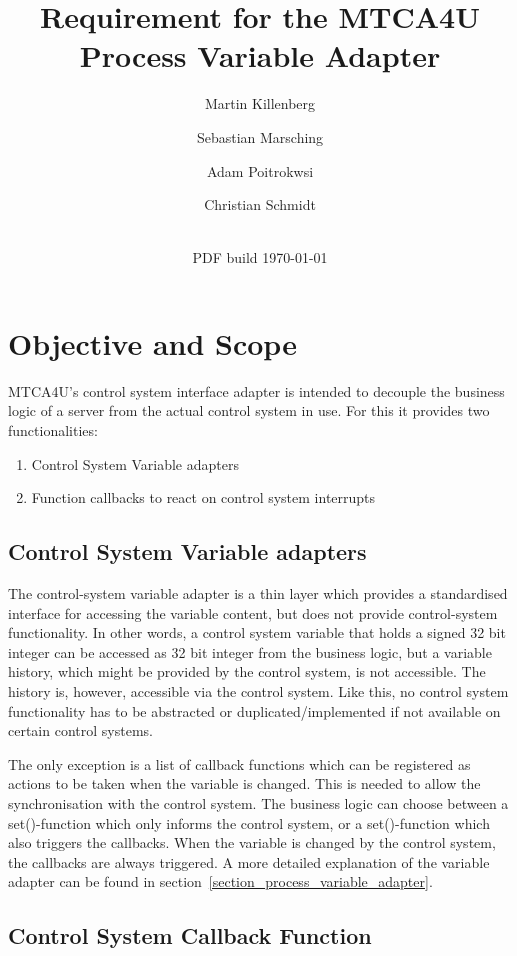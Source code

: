 \documentclass[11pt,a4paper]{scrartcl}
\title{Requirement for the MTCA4U Process Variable Adapter}
\date{\svnrevision\\ PDF build \today}
\author[1]{Martin Killenberg} \author[2]{Sebastian Marsching}
\author[3]{Adam Poitrokwsi}
\author[1]{Christian Schmidt}
\affil[1]{Deutsches Elektronen-Synchrotron DESY, Hamburg, Germany}
\affil[2]{aquenos GmbH, Baden-Baden, Germany}
\affil[3]{FastLogic Sp.\ z o.\ o., \L\'od\'z, Poland}
\begin{document}
\maketitle
\section{Objective and Scope}

MTCA4U's control system interface adapter is intended to decouple the business
logic of a server from the actual control system in use. For this it provides
two functionalities: 
\begin{enumerate}
  \item Control System Variable adapters
  \item Function callbacks to react on control system interrupts
\end{enumerate}

\subsection{Control System Variable adapters}

The control-system variable adapter is a thin layer which provides a
standardised interface for accessing the variable content, but does not provide
control-system functionality. In other words, a control system variable that
holds a signed 32 bit integer can be accessed as 32 bit integer from the
business logic, but a variable history, which might be provided by the control
system, is not accessible. The history is, however, accessible via the control
system. Like this, no control system functionality has to be abstracted or
duplicated/implemented if not available on certain control systems. 

The only exception is a list of callback functions which can be registered as
actions to be taken when the variable is changed. This is needed to allow the
synchronisation with the control system. The business logic can choose between
a set()-function which only informs the control system, or a set()-function
which also triggers the callbacks. When the variable is changed by the control
system, the callbacks are always triggered. A more detailed explanation of the
variable adapter can be found in
section~\ref{section_process_variable_adapter}. 

\subsection{Control System Callback Function}
\end{document}
